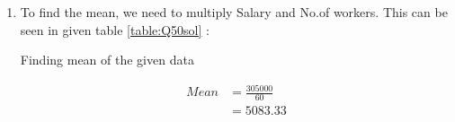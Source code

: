 \renewcommand{\theequation}{\theenumi}
\begin{enumerate}[label=\thesection.\arabic*.,ref=\thesection.\theenumi]
\item To find the mean, we need to multiply Salary and No.of workers. This can be seen in given table \ref{table:Q50sol} :
\begin{table}[ht!]
\centering

\label{table:Q50sol}	
\caption{Finding mean of the given data}
\end{table}
\begin{align}
Mean &= \frac{305000}{60}\\
&= 5083.33
\end{align}
\end{enumerate}
